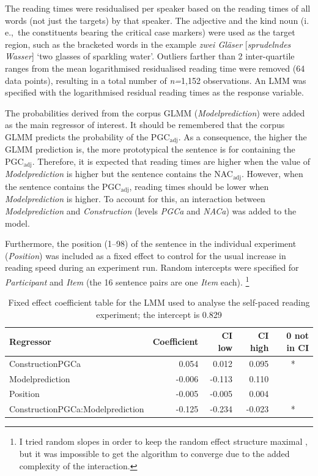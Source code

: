 \documentclass[USenglish]{article}
\newcommand{\ie}{i.\,e.,}
\newcommand{\Sub}[1]{\ensuremath{\mathrm{_{#1}}}}
\newcommand{\NACa}{NAC\Sub{adj}}
\newcommand{\PGCa}{PGC\Sub{adj}}
\begin{document}
The reading times were residualised per speaker based on the reading times of all words (not just the targets) by that speaker.
The adjective and the kind noun (\ie\ the constituents bearing the critical case markers) were used as the target region, such as the bracketed words in the example \textit{zwei Gläser} [\textit{spru\-deln\-des Wasser}] `two glasses of sparkling water'.
Outliers farther than 2 inter-quartile ranges from the mean logarithmised residualised reading time were removed (64 data points), resulting in a total number of \textit{n=}1,152 observations.
An LMM was specified with the logarithmised residual reading times as the response variable.

The probabilities derived from the corpus GLMM (\textit{Modelprediction}) were added as the main regressor of interest.
It should be remembered that the corpus GLMM predicts the probability of the \PGCa.
As a consequence, the higher the GLMM prediction is, the more prototypical the sentence is for containing the \PGCa.
Therefore, it is expected that reading times are higher when the value of \textit{Modelprediction} is higher but the sentence contains the \NACa.
However, when the sentence contains the \PGCa, reading times should be lower when \textit{Modelprediction} is higher.
To account for this, an interaction between \textit{Modelprediction} and \textit{Construction} (levels \textit{PGCa} and \textit{NACa}) was added to the model.

Furthermore, the position (1--98) of the sentence in the individual experiment (\textit{Position}) was included as a fixed effect to control for the usual increase in reading speed during an experiment run.
Random intercepts were specified for \textit{Participant} and \textit{Item} (the 16 sentence pairs are one \textit{Item} each).%
\footnote{I tried random slopes in order to keep the random effect structure maximal \citep{BarrEa2013}, but it was impossible to get the algorithm to converge due to the added complexity of the interaction.}

\begin{table}
  \centering
  \begin{tabular}{lrrrc}
    Regressor & \multicolumn{1}{r}{Coefficient} & \multicolumn{1}{r}{CI low} & \multicolumn{1}{r}{CI high} & \multicolumn{1}{r}{0 not in CI} \\ \midrule
    ConstructionPGCa                 &  0.054 &  0.012 &  0.095 &  *  \\ 
    Modelprediction                  & -0.006 & -0.113 &  0.110 &     \\ 
    Position                         & -0.005 & -0.005 &  0.004 &     \\ 
    ConstructionPGCa:Modelprediction & -0.125 & -0.234 & -0.023 &  *  \\ 
  \end{tabular}
  \caption{Fixed effect coefficient table for the LMM used to analyse the self-paced reading experiment; the intercept is 0.829}
  \label{tab:exp:spr}
\end{table}
\end{document}
